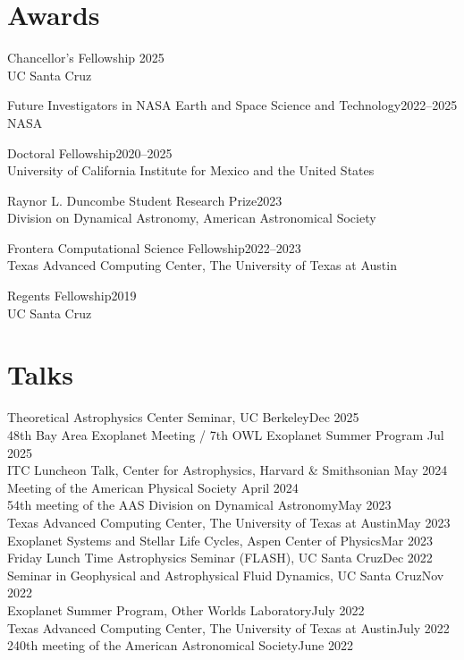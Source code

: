 \documentclass[12pt]{article}
\begin{document}
\section*{Awards}
Chancellor's Fellowship \hfill 2025\\
UC Santa Cruz

Future Investigators in NASA Earth and Space Science and Technology\hfill 2022--2025\\
NASA

Doctoral Fellowship\hfill2020--2025\\
University of California Institute for Mexico and the United States

Raynor L. Duncombe Student Research Prize\hfill2023\\
Division on Dynamical Astronomy, American Astronomical Society

Frontera Computational Science Fellowship\hfill 2022--2023\\
Texas Advanced Computing Center, The University of Texas at Austin

Regents Fellowship\hfill 2019\\
UC Santa Cruz

\section*{Talks}
Theoretical Astrophysics Center Seminar, UC Berkeley\hfill Dec 2025\\
48th Bay Area Exoplanet Meeting / 7th OWL Exoplanet Summer Program \hfill Jul 2025\\
ITC Luncheon Talk, Center for Astrophysics, Harvard \& Smithsonian \hfill May 2024\\
Meeting of the American Physical Society \hfill April 2024\\
54th meeting of the AAS Division on Dynamical Astronomy\hfill May 2023\\
Texas Advanced Computing Center, The University of Texas at Austin\hfill May 2023\\
Exoplanet Systems and Stellar Life Cycles, Aspen Center of Physics\hfill Mar 2023\\
Friday Lunch Time Astrophysics Seminar (FLASH), UC Santa Cruz\hfill Dec 2022\\
Seminar in Geophysical and Astrophysical Fluid Dynamics, UC Santa Cruz\hfill Nov 2022\\
Exoplanet Summer Program, Other Worlds Laboratory\hfill July 2022\\
Texas Advanced Computing Center, The University of Texas at Austin\hfill July 2022\\
240th meeting of the American Astronomical Society\hfill June 2022
\end{document}
